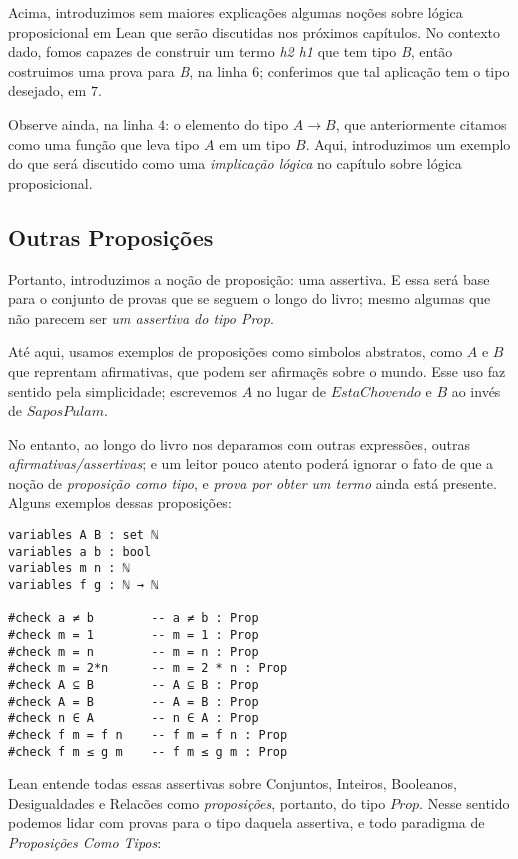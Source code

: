\noindent Acima, introduzimos sem maiores explicações algumas noções sobre lógica proposicional em Lean que serão discutidas nos próximos capítulos. No contexto dado, fomos capazes de construir um termo \textit{h2 h1} que tem tipo \textit{B}, então costruimos uma prova para \textit{B}, na linha $6$; conferimos que tal aplicação tem o tipo desejado, em $7$.

Observe ainda, na linha $4$: o elemento do tipo $A → B$, que anteriormente citamos como uma função que leva tipo $A$ em um tipo $B$.
Aqui, introduzimos um exemplo do que será discutido como uma \textit{implicação lógica} no capítulo sobre lógica proposicional.

\subsection{Outras Proposições}
Portanto, introduzimos a noção de proposição: uma assertiva. E essa será base para o conjunto de provas que se seguem o longo do livro; mesmo algumas que não parecem ser \textit{um assertiva do tipo Prop}.

Até aqui, usamos exemplos de proposições como simbolos abstratos, como $A$ e $B$ que reprentam afirmativas, que podem ser afirmaçẽs sobre o mundo. Esse uso faz sentido pela simplicidade; escrevemos $A$ no lugar de $EstaChovendo$ e $B$ ao invés de $SaposPulam$.

No entanto, ao longo do livro nos deparamos com outras expressões, outras \textit{afirmativas/assertivas}; e um leitor pouco atento poderá ignorar o fato de que a noção de \textit{proposição como tipo}, e \textit{prova por obter um termo} ainda está presente. Alguns exemplos dessas proposições:

\vspace{5mm}
\begin{lstlisting}
variables A B : set ℕ
variables a b : bool
variables m n : ℕ
variables f g : ℕ → ℕ

#check a ≠ b        -- a ≠ b : Prop
#check m = 1        -- m = 1 : Prop
#check m = n        -- m = n : Prop
#check m = 2*n      -- m = 2 * n : Prop
#check A ⊆ B        -- A ⊆ B : Prop
#check A = B        -- A = B : Prop
#check n ∈ A        -- n ∈ A : Prop
#check f m = f n    -- f m = f n : Prop
#check f m ≤ g m    -- f m ≤ g m : Prop
\end{lstlisting}
\vspace{5mm}

\noindent Lean entende todas essas assertivas sobre Conjuntos, Inteiros, Booleanos, Desigualdades e Relacões como \textit{proposições}, portanto, do tipo $Prop$.
Nesse sentido podemos lidar com provas para o tipo daquela assertiva, e todo paradigma de \textit{Proposições Como Tipos}:

